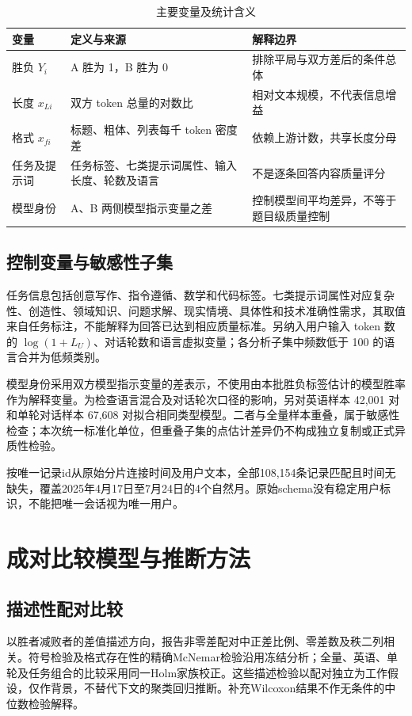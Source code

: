 \documentclass[UTF8,11pt,a4paper,fontset=windows]{ctexart}
\numberwithin{equation}{section}
\begin{document}
\begin{table}[htbp]\centering\small
\caption{主要变量及统计含义}\label{tab:vars}
\begin{tabularx}{\textwidth}{p{2.8cm}Y Y}
\toprule
变量 & 定义与来源 & 解释边界\\
\midrule
胜负 $Y_i$ & A 胜为 1，B 胜为 0 & 排除平局与双方差后的条件总体\\
长度 $x_{Li}$ & 双方 token 总量的对数比 & 相对文本规模，不代表信息增益\\
格式 $x_{fi}$ & 标题、粗体、列表每千 token 密度差 & 依赖上游计数，共享长度分母\\
任务及提示词 & 任务标签、七类提示词属性、输入长度、轮数及语言 & 不是逐条回答内容质量评分\\
模型身份 & A、B 两侧模型指示变量之差 & 控制模型间平均差异，不等于题目级质量控制\\
\bottomrule
\end{tabularx}
\end{table}

\subsection{控制变量与敏感性子集}
任务信息包括创意写作、指令遵循、数学和代码标签。七类提示词属性对应复杂性、创造性、领域知识、问题求解、现实情境、具体性和技术准确性需求，其取值来自任务标注，不能解释为回答已达到相应质量标准。另纳入用户输入 token 数的 $\log(1+L_U)$、对话轮数和语言虚拟变量；各分析子集中频数低于 100 的语言合并为低频类别。

模型身份采用双方模型指示变量的差表示，不使用由本批胜负标签估计的模型胜率作为解释变量。为检查语言混合及对话轮次口径的影响，另对英语样本 42,001 对和单轮对话样本 67,608 对拟合相同类型模型。二者与全量样本重叠，属于敏感性检查；本次统一标准化单位，但重叠子集的点估计差异仍不构成独立复制或正式异质性检验。


按唯一记录id从原始分片连接时间及用户文本，全部108,154条记录匹配且时间无缺失，覆盖2025年4月17日至7月24日的4个自然月。原始schema没有稳定用户标识，不能把唯一会话视为唯一用户。

\section{成对比较模型与推断方法}
\subsection{描述性配对比较}
以胜者减败者的差值描述方向，报告非零差配对中正差比例、零差数及秩二列相关。符号检验及格式存在性的精确McNemar检验沿用冻结分析；全量、英语、单轮及任务组合的比较采用同一Holm家族校正\cite{holm}。这些描述检验以配对独立为工作假设，仅作背景，不替代下文的聚类回归推断。补充Wilcoxon结果不作无条件的中位数检验解释。
\end{document}

